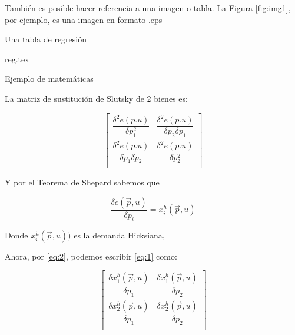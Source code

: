 \documentclass[utf8, twoside,]{article}
\begin{document}
\begin{otherlanguage}{spanish}
También es posible hacer referencia a una imagen o tabla. La Figura \ref{fig:img1}, por ejemplo, es una imagen en formato .eps





 
 Una tabla de regresión
 
 \begin{table}[ht]
 {reg.tex}
 \caption{Tabla importada de Stata} \label{table:reg1}
\end{table}

 
 Ejemplo de matemáticas
 
 La matriz de sustitución de Slutsky de 2 bienes es:
 
 \begin{equation}\label{eq:1}
    \begin{bmatrix}
 \dfrac{\delta^2e(p.u)}{\delta p_1^2} & \dfrac{\delta^2e(p.u)}{\delta p_2 \delta p_1} \\[2ex]
 \dfrac{\delta^2e(p.u)}{\delta p_1\delta p_2} & \dfrac{\delta^2e(p.u)}{\delta p_2^2} \\[2ex]
 \end{bmatrix}
\end{equation}
 

  Y por el Teorema de Shepard sabemos que 
  
   \begin{equation}\label{eq:2}
   \dfrac{\delta e (\vec{p}, u)}{\delta p_i} = x_i^h(\vec{p}, u)
   \end{equation}
   
   Donde $x_i^h(\vec{p}, u))$ es la demanda Hicksiana,
  
   Ahora, por \eqref{eq:2}, podemos escribir \eqref{eq:1} como:
   
    \begin{equation}
    \begin{bmatrix}
 \dfrac{\delta x_1^h(\vec{p}, u)}{\delta p_1} 
 & \dfrac{\delta x_1^h(\vec{p}, u)}{\delta p_2} \\[2ex]
 \dfrac{\delta x_2^h(\vec{p}, u)}{\delta p_1} 
 & \dfrac{\delta x_2^h(\vec{p}, u)}{\delta p_2} \\[2ex]
 \end{bmatrix}
\end{equation}
  

\end{otherlanguage}
\end{document}
